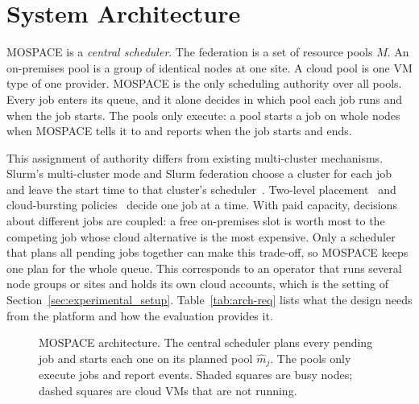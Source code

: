 \section{System Architecture}
\label{sec:architecture}

MOSPACE is a \emph{central scheduler}. The federation is a set of resource
pools $M$. An on-premises pool is a group of identical nodes at one site. A
cloud pool is one VM type of one provider. MOSPACE is the only scheduling
authority over all pools. Every job enters its queue, and it alone decides in
which pool each job runs and when the job starts. The pools only execute: a
pool starts a job on whole nodes when MOSPACE tells it to and reports when
the job starts and ends.

This assignment of authority differs from existing multi-cluster
mechanisms. Slurm's multi-cluster mode and Slurm federation choose a cluster
for each job and leave the start time to that cluster's
scheduler~\cite{Yoo2003,Jette2023}. Two-level placement~\cite{Wang2025Efficient}
and cloud-bursting policies~\cite{Luo24,ambati2021good} decide one job at a
time. With paid capacity, decisions about different jobs are coupled: a free
on-premises slot is worth most to the competing job whose cloud alternative
is the most expensive. Only a scheduler that plans all pending jobs together
can make this trade-off, so MOSPACE keeps one plan for the whole queue. This
corresponds to an operator that runs several node groups or sites and holds
its own cloud accounts, which is the setting of
Section~\ref{sec:experimental_setup}. Table~\ref{tab:arch-req} lists what the
design needs from the platform and how the evaluation provides it.

\begin{figure}[t]
  \centering
  
  \caption{MOSPACE architecture. The central scheduler plans every pending
  job and starts each one on its planned pool $\hat m_j$. The pools only
  execute jobs and report events. Shaded squares are busy nodes; dashed
  squares are cloud VMs that are not running.}
  \label{fig:architecture}
\end{figure}

